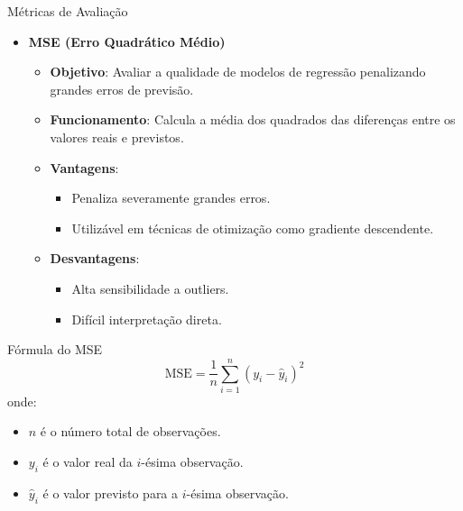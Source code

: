 \documentclass[handout,aspectratio = 169]{beamer}
\begin{document}

\begin{frame}{Métricas de Avaliação}
\begin{itemize}
    \item \textbf{MSE (Erro Quadrático Médio)}
    \begin{itemize}
        \item \textbf{Objetivo}: Avaliar a qualidade de modelos de regressão penalizando grandes erros de previsão.
        \item \textbf{Funcionamento}: Calcula a média dos quadrados das diferenças entre os valores reais e previstos.
        \item \textbf{Vantagens}:
        \begin{itemize}
            \item Penaliza severamente grandes erros.
            \item Utilizável em técnicas de otimização como gradiente descendente.
        \end{itemize}
        \item \textbf{Desvantagens}:
        \begin{itemize}
            \item Alta sensibilidade a outliers.
            \item Difícil interpretação direta.
        \end{itemize}
    \end{itemize}
\end{itemize}
\end{frame}

\begin{frame}{Fórmula do MSE}
\begin{equation}
\text{MSE} = \frac{1}{n} \sum_{i=1}^{n} (y_i - \hat{y}_i)^2
\end{equation}
onde:
\begin{itemize}
    \item \( n \) é o número total de observações.
    \item \( y_i \) é o valor real da \( i \)-ésima observação.
    \item \( \hat{y}_i \) é o valor previsto para a \( i \)-ésima observação.
\end{itemize}
\end{frame}
\end{document}
